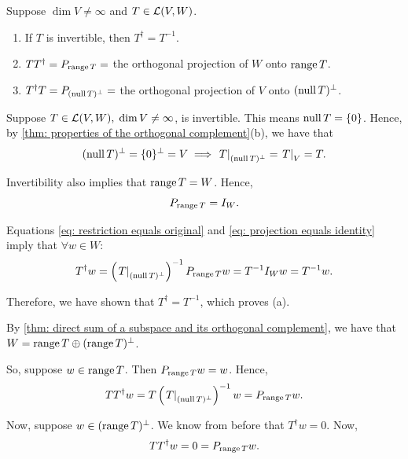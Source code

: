 \begin{thm} 
  \label{thm: algebraic properties of the pseudoinverse}
  Suppose $\dim V \neq \infty$ and $T\in \mathcal{L}(V,W)$.
  \begin{enumerate}[label=(\alph*)]
    \item If $T$ is invertible, then $T^\dagger = T^{-1}$.
    \item $T T^\dagger = P_{\operatorname{range} T} =$ the orthogonal projection of $W$ onto $\operatorname{range} T$.
    \item $T^\dagger T = P_{(\operatorname{null} T)^\bot} =$ the orthogonal projection of $V$ onto $(\operatorname{null} T)^\bot$.
  \end{enumerate}
\end{thm}
\begin{prf}
  Suppose $T \in \mathcal{L}(V,W), \; \dim V \neq \infty$, is invertible. This means $\operatorname{null} T = \{0\}$. Hence, by \ref{thm: properties of the orthogonal complement}(b), we have that
  \begin{equation}
      \label{eq: restriction equals original}
      (\operatorname{null} T)^\bot = \{0\}^\bot = V \implies \left. T \right |_{(\operatorname{null} T)^\bot} = \left. T \right|_V= T.
  \end{equation}

  Invertibility also implies that $\operatorname{range} T = W$. Hence,
  \begin{equation}
    \label{eq: projection equals identity}
    P_{\operatorname{range} T} = I_W.
  \end{equation}


  Equations \eqref{eq: restriction equals original} and \eqref{eq: projection equals identity} imply that $\forall w \in W$:
  \[
    T^\dagger w = \left( \left. T \right|_{(\operatorname{null} T)^\bot} \right)^{-1} P_{\operatorname{range} T} w = T^{-1} I_W w = T^{-1} w.
  \]

  Therefore, we have shown that $T^\dagger = T^{-1}$, which proves (a).

   By \ref{thm: direct sum of a subspace and its orthogonal complement}, we have that $W= \operatorname{range} T \oplus (\operatorname{range} T)^\bot$.

  So, suppose $w \in \operatorname{range} T$. Then $P_{\operatorname{range} T} w=w$. Hence,
  \[
    T T^\dagger w = T \left( \left. T \right|_{(\operatorname{null} T)^\bot} \right)^{-1} w = P_{\operatorname{range} T} w.
  \]

  Now, suppose $w \in (\operatorname{range} T)^\bot$. We know from before that $T^\dagger w = 0$. Now,
  \[
    T T^\dagger w = 0 = P_{\operatorname{range} T} w.
  \]


\end{prf}
